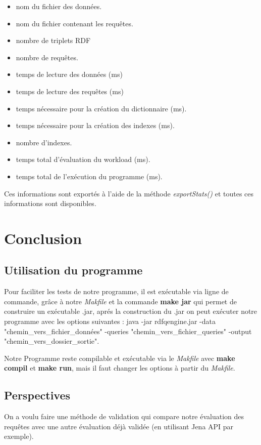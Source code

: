 \documentclass[12pt,titlepage]{article}
\begin{document}
\begin{itemize}
  \item nom du fichier des données.
  \item nom du fichier contenant les requêtes.
  \item nombre de triplets RDF
  \item nombre de requêtes.
  \item temps de lecture des données (ms) 
  \item temps de lecture des requêtes (ms)
  \item temps nécessaire pour la création du dictionnaire (ms).
  \item temps nécessaire pour la création des indexes (ms). 
  \item nombre d'indexes.
  \item temps total d'évaluation du workload (ms). 
  \item temps total de l'exécution du programme (ms).

\end{itemize}

Ces informations sont exportés à l'aide de la méthode \textit{exportStats()} et toutes ces informations sont disponibles.

\section{Conclusion}

\subsection{Utilisation du programme}
Pour faciliter les tests de notre programme, il est exécutable via ligne de commande, grâce à notre \textit{Makfile} et la commande \textbf{make jar} qui permet de construire un exécutable .jar, aprés la construction du .jar on peut exécuter notre programme avec les options suivantes : 
java -jar rdfqengine.jar -data "chemin_vers_fichier_données" -queries "chemin_vers_fichier_queries" -output "chemin_vers_dossier_sortie".

Notre Programme reste compilable et exécutable via le \textit{Makfile} avec \textbf{make compil} et \textbf{make run}, mais il faut changer les options à partir du \textit{Makfile}.


\subsection{Perspectives}
On a voulu faire une méthode de validation qui compare notre évaluation des requêtes avec une autre évaluation déjà validée (en utilisant Jena API par exemple).
\end{document}
